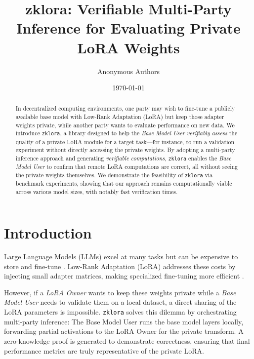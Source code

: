 \documentclass[11pt]{article}
\title{\textbf{zklora: Verifiable Multi-Party Inference for Evaluating Private LoRA Weights}}
\author{Anonymous Authors}
\date{\today}
\begin{document}
\maketitle

\begin{abstract}
In decentralized computing environments, one party may wish to fine-tune a publicly available base model with Low-Rank Adaptation (LoRA) but keep those adapter weights private, while another party wants to evaluate performance on new data. 
We introduce \texttt{zklora}, a library designed to help the \emph{Base Model User} \emph{verifiably assess} the quality of a private LoRA module for a target task---for instance, to run a validation experiment without directly accessing the private weights. 
By adopting a multi-party inference approach and generating \emph{verifiable computations}, \texttt{zklora} enables the \emph{Base Model User} to confirm that remote LoRA computations are correct, all without seeing the private weights themselves. 
We demonstrate the feasibility of \texttt{zklora} via benchmark experiments, showing that our approach remains computationally viable across various model sizes, with notably fast verification times.
\end{abstract}

\section{Introduction}
Large Language Models (LLMs) excel at many tasks but can be expensive to store and fine-tune \cite{brown2020language, devlin2018bert}. 
Low-Rank Adaptation (LoRA) \cite{hu2021lora} addresses these costs by injecting small adapter matrices, making specialized fine-tuning more efficient \cite{ding2022delta}. 

However, if a \emph{LoRA Owner} wants to keep these weights private while a \emph{Base Model User} needs to validate them on a local dataset, a direct sharing of the LoRA parameters is impossible. \texttt{zklora} solves this dilemma by orchestrating multi-party inference: The Base Model User runs the base model layers locally, forwarding partial activations to the LoRA Owner for the private transform. A zero-knowledge proof is generated to demonstrate correctness, ensuring that final performance metrics are truly representative of the private LoRA.

\end{document}
